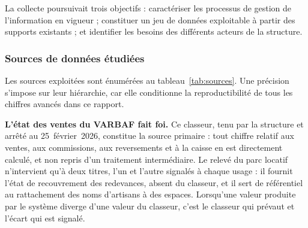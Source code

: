 La collecte poursuivait trois objectifs : caractériser les processus de gestion de l'information en vigueur ; constituer un jeu de données exploitable à partir des supports existants ; et identifier les besoins des différents acteurs de la structure.

\subsubsection{Sources de données étudiées}

Les sources exploitées sont énumérées au tableau~\ref{tab:sources}. Une précision s'impose sur leur hiérarchie, car elle conditionne la reproductibilité de tous les chiffres avancés dans ce rapport.

\textbf{L'état des ventes du VARBAF fait foi.} Ce classeur, tenu par la structure et arrêté au 25~février~2026, constitue la source primaire : tout chiffre relatif aux ventes, aux commissions, aux reversements et à la caisse en est directement calculé, et non repris d'un traitement intermédiaire. Le relevé du parc locatif n'intervient qu'à deux titres, l'un et l'autre signalés à chaque usage : il fournit l'état de recouvrement des redevances, absent du classeur, et il sert de référentiel au rattachement des noms d'artisans à des espaces. Lorsqu'une valeur produite par le système diverge d'une valeur du classeur, c'est le classeur qui prévaut et l'écart qui est signalé.

